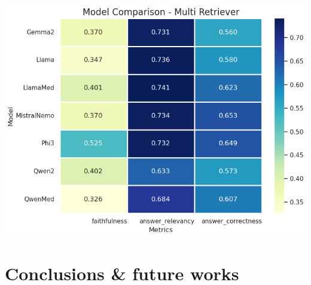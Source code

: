 \documentclass[handout]{beamer}\mode<handout>{\usetheme{AMSBolognaFC}}
\begin{document}
\begin{frame}[allowframebreaks]
    \framebreak

    \vfill
    \centering
    \includegraphics[height=0.8\textheight]{figures/multiretriever}

\end{frame}


\section{Conclusions \& future works}
\end{document}
